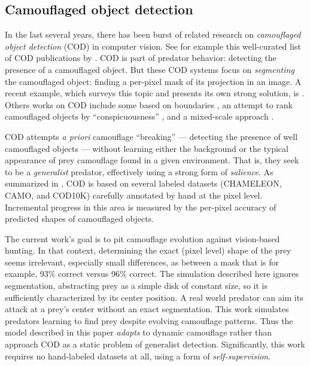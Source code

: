\documentclass[sigconf]{acmart}
\newcommand{\jargon}[1]{\textit{#1}}
\begin{document}
\subsection{Camouflaged object detection}
In the last several years, there has been burst of related research on \jargon{camouflaged object detection} (COD) in computer vision. See for example this well-curated list of COD publications by \citet{visionxiang_cod}. COD is part of predator behavior: detecting the presence of a camouflaged object. But these COD systems focus on \jargon{segmenting} the camouflaged object: finding a per-pixel mask of its projection in an image. A recent example, which surveys this topic and presents its own strong solution, is \citet{Zhang2022}. Others works on COD include some based on boundaries \cite{chen_boundary-guided_2022} \cite{sun_boundary-guided_2022}, an attempt to rank camouflaged objects by “conspicuousness” \cite{lv_cod_2022}, and a mixed-scale approach \cite{pang_zoom_2022}.
\par
COD attempts \textit{a priori} camouflage “breaking” — detecting the presence of well camouflaged objects — without learning either the background or the typical appearance of prey camouflage found in a given environment. That is, they seek to be a \jargon{generalist} predator, effectively using a strong form of \jargon{salience}. As summarized in \citet{Zhang2022}, COD is based on several labeled datasets (CHAMELEON, CAMO, and COD10K) carefully annotated by hand at the pixel level. Incremental progress in this area is measured by the per-pixel accuracy of predicted shapes of camouflaged objects.
\par
The current work's goal is to pit camouflage evolution against vision-based hunting. In that context, determining the exact (pixel level) shape of the prey seems irrelevant, especially small differences, as between a mask that is for example, 93\% correct versus 96\% correct. The simulation described here ignores segmentation, abstracting prey as a simple disk of constant size, so it is sufficiently characterized by its center position. A real world predator can aim its attack at a prey's center without an exact segmentation. This work simulates predators learning to find prey despite evolving camouflage patterns. Thus the model described in this paper \jargon{adapts} to dynamic camouflage rather than approach COD as a static problem of generalist detection. Significantly, this work requires no hand-labeled datasets at all, using a form of \jargon{self-supervision}.
\par
\end{document}

